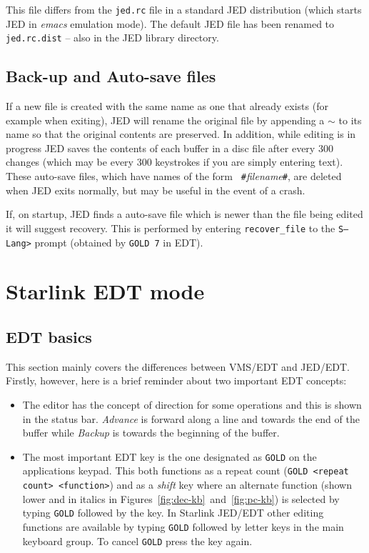 \documentclass[twoside,11pt]{article}
\newcommand{\xlabel}[1]{}
\begin{document}
This file differs from the \texttt{jed.rc} file in a standard JED
distribution (which starts JED in \textit{emacs} emulation mode). The
default JED file has been renamed to \texttt{jed.rc.dist}  -- also in
the JED library directory. 

\subsection{\xlabel{backup_and_auto-save_files}Back-up and Auto-save files}
\label{backup_and_auto-save_files}

If a new file is created with the same name as one that already exists
(for example when exiting), JED will rename the original file by
appending a $\sim$ to its name so that the original contents are
preserved. In addition, while editing is in progress JED saves the
contents of each buffer in a disc file after every 300 changes (which may
be every 300 keystrokes if you are simply entering text). These auto-save
files, which have names of the form {\tt
\#}{\em filename}\texttt{\#}, are deleted when JED exits
normally, but may be useful in the event of a crash.

If, on startup, JED finds a auto-save file which is newer than the file being
edited it will suggest recovery. This is performed by entering
\texttt{recover\_file} to the \texttt{S--Lang>} prompt (obtained by
\texttt{GOLD 7} in EDT).

\section{\xlabel{starlink_edt_mode}Starlink EDT mode}
\label{starlink_edt_mode}

\subsection{\xlabel{edt_basics}EDT basics}
\label{edt_basics}

This section mainly covers the  differences between VMS/EDT and
JED/EDT\@. Firstly, however, here is a brief reminder about two important EDT 
concepts:
\begin{itemize}
\item The editor has the concept of direction for some operations and
this is shown in the status bar. \textit{Advance} is forward along a
line and towards the end of the buffer while \textit{Backup} is towards the
beginning of the buffer.

\item The most important EDT key is the one designated as \texttt{GOLD} on
the applications keypad. This both functions as a repeat count
(\texttt{GOLD <repeat count> <function>}) and as a 
\textit{shift} key where an alternate function (shown lower and in italics in
Figures~{\ref{fig:dec-kb}}~and~\ref{fig:pc-kb}) is selected by typing
\texttt{GOLD} followed by the key. In Starlink JED/EDT other editing
functions are available by typing \texttt{GOLD} followed by letter keys in 
the main keyboard group. To cancel \texttt{GOLD} press the key again.

\end{itemize}
\end{document}
